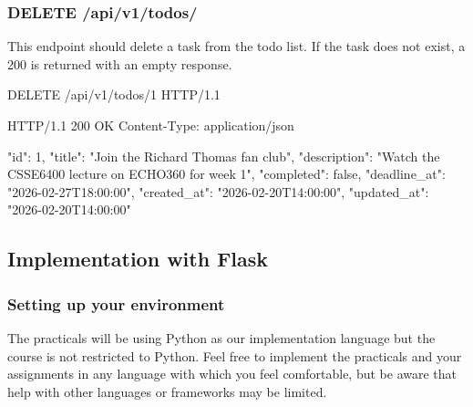 \documentclass{csse4400}
\begin{document}
\subsubsection{DELETE /api/v1/todos/}
This endpoint should delete a task from the todo list.
If the task does not exist, a 200 is returned with an empty response.

\begin{code}[language=json,numbers=none]{}
DELETE /api/v1/todos/1 HTTP/1.1
\end{code}
\begin{code}[language=json,numbers=none]{}
HTTP/1.1 200 OK
Content-Type: application/json

{
    "id": 1,
    "title": "Join the Richard Thomas fan club",
    "description": "Watch the CSSE6400 lecture on ECHO360 for week 1",
    "completed": false,
    "deadline_at": "2026-02-27T18:00:00",
    "created_at": "2026-02-20T14:00:00",
    "updated_at": "2026-02-20T14:00:00"
}
\end{code}

\subsection{Implementation with Flask}

\subsubsection{Setting up your environment}

The practicals will be using Python as our implementation language but the course is not restricted to Python.
Feel free to implement the practicals and your assignments in any language with which you feel comfortable,
but be aware that help with other languages or frameworks may be limited.


\end{document}
